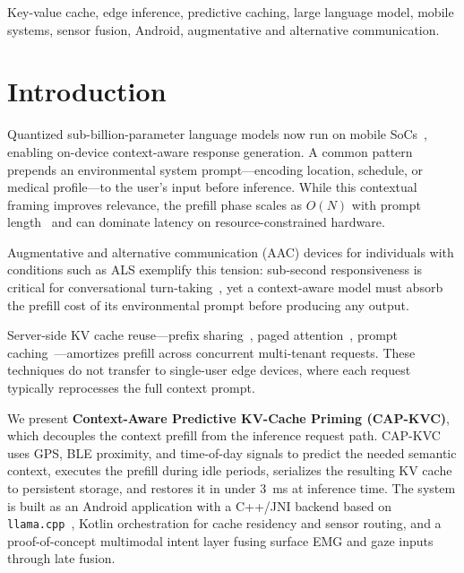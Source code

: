 \documentclass[journal]{IEEEtran}
\begin{document}
\begin{IEEEkeywords}
Key-value cache, edge inference, predictive caching, large language model, mobile systems, sensor fusion, Android, augmentative and alternative communication.
\end{IEEEkeywords}

\section{Introduction}
\label{sec:introduction}

Quantized sub-billion-parameter language models now run on mobile SoCs~\cite{dettmers2022,frantar2022,llamacpp}, enabling on-device context-aware response generation. A common pattern prepends an environmental system prompt---encoding location, schedule, or medical profile---to the user's input before inference. While this contextual framing improves relevance, the prefill phase scales as $O(N)$ with prompt length~\cite{vaswani2017} and can dominate latency on resource-constrained hardware.

Augmentative and alternative communication (AAC) devices for individuals with conditions such as ALS exemplify this tension: sub-second responsiveness is critical for conversational turn-taking~\cite{beukelman2020}, yet a context-aware model must absorb the prefill cost of its environmental prompt before producing any output.

Server-side KV cache reuse---prefix sharing~\cite{sglang}, paged attention~\cite{vllm}, prompt caching~\cite{cachegen}---amortizes prefill across concurrent multi-tenant requests. These techniques do not transfer to single-user edge devices, where each request typically reprocesses the full context prompt.

We present \textbf{Context-Aware Predictive KV-Cache Priming (CAP-KVC)}, which decouples the context prefill from the inference request path. CAP-KVC uses GPS, BLE proximity, and time-of-day signals to predict the needed semantic context, executes the prefill during idle periods, serializes the resulting KV cache to persistent storage, and restores it in under 3~ms at inference time. The system is built as an Android application with a C++/JNI backend based on \texttt{llama.cpp}~\cite{llamacpp}, Kotlin orchestration for cache residency and sensor routing, and a proof-of-concept multimodal intent layer fusing surface EMG and gaze inputs through late fusion.
\end{document}
